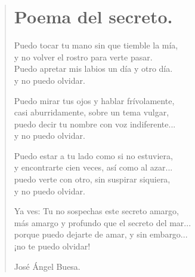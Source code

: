 \documentclass[11pt, portrait, twoside, notitlepage, openright]{book}
\begin{document}
\newpage
\begin{verse}
\begin{center}
\section{Poema del secreto.}
\end{center}
Puedo tocar tu mano sin que tiemble la mía,\\
y no volver el rostro para verte pasar.\\
Puedo apretar mis labios un día y otro día.\\
y no puedo olvidar. 
\newline

Puedo mirar tus ojos y hablar frívolamente,\\
casi aburridamente, sobre un tema vulgar,\\
puedo decir tu nombre con voz indiferente...\\
y no puedo olvidar.
\newline

Puedo estar a tu lado como si no estuviera,\\
y encontrarte cien veces, así como al azar...\\
puedo verte con otro, sin suspirar siquiera,\\
y no puedo olvidar.
\newline

Ya ves: Tu no sospechas este secreto amargo,\\
más amargo y profundo que el secreto del mar...\\
porque puedo dejarte de amar, y sin embargo...\\
¡no te puedo olvidar!
\newline

José Ángel Buesa.
\end{verse}
\end{document}
